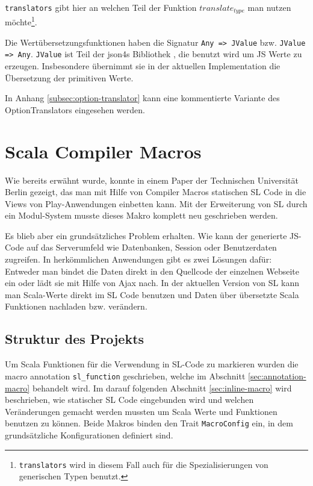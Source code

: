 \documentclass[12pt]{scrreprt}
\begin{document}
\lstinline!translators! gibt hier an welchen Teil der Funktion $translate_{type}$ man nutzen möchte\footnote{\lstinline!translators! wird in diesem Fall auch für die Spezialisierungen von generischen Typen benutzt.}. 

Die Wertübersetzungsfunktionen haben die Signatur \lstinline!Any => JValue! bzw. \lstinline!JValue => Any!. \lstinline!JValue! ist Teil der json4s Bibliothek \cite{Json4s}, die benutzt wird um JS Werte zu erzeugen. Insbesondere übernimmt sie in der aktuellen Implementation die Übersetzung der primitiven Werte.

In Anhang \ref{subsec:option-translator} kann eine kommentierte Variante des OptionTranslators eingesehen werden.

\chapter{Scala Compiler Macros}
\label{chap:scala-compiler-macros}

Wie bereits erwähnt wurde, konnte in einem Paper der Technischen Universität Berlin gezeigt, das man mit Hilfe von Compiler Macros statischen \ac{SL} Code in die Views von Play-Anwendungen einbetten kann\cite{Hoger2013}. Mit der Erweiterung von \ac{SL} durch ein Modul-System musste dieses Makro komplett neu geschrieben werden.

Es blieb aber ein grundsätzliches Problem erhalten. Wie kann der generierte \ac{JS}-Code auf das Serverumfeld wie Datenbanken, Session oder Benutzerdaten zugreifen. In herkömmlichen Anwendungen gibt es zwei Lösungen dafür: Entweder man bindet die Daten direkt in den Quellcode der einzelnen Webseite ein oder lädt sie mit Hilfe von Ajax nach. In der aktuellen Version von \ac{SL} kann man Scala-Werte direkt im \ac{SL} Code benutzen und Daten über übersetzte Scala Funktionen nachladen bzw. verändern.

\section{Struktur des Projekts}
\label{sec:project-structure}

Um Scala Funktionen für die Verwendung in \ac{SL}-Code zu markieren wurden die macro annotation \lstinline!sl_function! geschrieben, welche im Abschnitt \ref{sec:annotation-macro} behandelt wird. Im darauf folgenden Abschnitt \ref{sec:inline-macro} wird beschrieben, wie statischer \ac{SL} Code eingebunden wird und welchen Veränderungen gemacht werden mussten um Scala Werte und Funktionen benutzen zu können. Beide Makros binden den Trait \lstinline!MacroConfig! ein, in dem grundsätzliche Konfigurationen definiert sind. 
\end{document}
